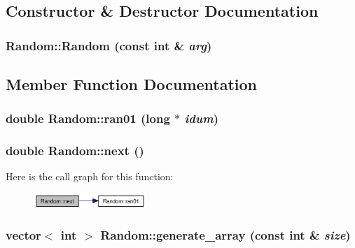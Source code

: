\subsection{Constructor \& Destructor Documentation}
\hypertarget{classRandom_9a974d20ddfe8d3446b6c5caf1070fab}{
\subsubsection{\setlength{\rightskip}{0pt plus 5cm}Random::Random (const int \& {\em arg})}}
\label{classRandom_9a974d20ddfe8d3446b6c5caf1070fab}




\subsection{Member Function Documentation}
\hypertarget{classRandom_edbbb92c4f516da86f3546021267b7b0}{
\subsubsection{\setlength{\rightskip}{0pt plus 5cm}double Random::ran01 (long $\ast$ {\em idum})}}
\label{classRandom_edbbb92c4f516da86f3546021267b7b0}


\hypertarget{classRandom_496fd24cf56a81dc0e0e35bc89e22dd4}{
\subsubsection{\setlength{\rightskip}{0pt plus 5cm}double Random::next ()}}
\label{classRandom_496fd24cf56a81dc0e0e35bc89e22dd4}




Here is the call graph for this function:\nopagebreak
\begin{figure}[H]
\begin{center}
\leavevmode
\includegraphics[width=120pt]{classRandom_496fd24cf56a81dc0e0e35bc89e22dd4_cgraph}
\end{center}
\end{figure}
\hypertarget{classRandom_d910cd5ff76a472b480f7917fbd7731c}{
\subsubsection{\setlength{\rightskip}{0pt plus 5cm}vector$<$ int $>$ Random::generate\_\-array (const int \& {\em size})}}
\label{classRandom_d910cd5ff76a472b480f7917fbd7731c}




